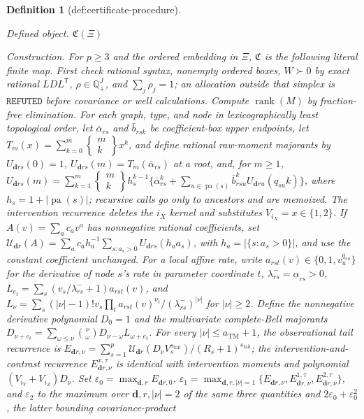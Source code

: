 \documentclass{article}
\newtheorem{definition}{Definition}
\begin{document}
\begin{definition}[def:certificate-procedure]\label{def:certificate-procedure}
\par\smallskip\noindent\emph{Defined object.} \(\mathfrak C(\Xi)\)
\par\smallskip\noindent\emph{Construction.} For \(p\geq3\) and the ordered embedding in \(\Xi\), \(\mathfrak C\) is the following literal finite map. First check rational syntax, nonempty ordered boxes, \(W\succ0\) by exact rational \(LDL^{\mathsf T}\), \(\rho\in\mathbb Q_+^J\), and \(\sum_j\rho_j=1\); an allocation outside that simplex is \(\mathtt{REFUTED}\) before covariance or well calculations. Compute \(\operatorname{rank}(M)\) by fraction-free elimination. For each graph, type, and node in lexicographically least topological order, let \(\bar\alpha_{rs}\) and \(\bar b_{rsk}\) be coefficient-box upper endpoints, let \(T_m(x)=\sum_{k=0}^m\left\{\begin{smallmatrix}m\\k\end{smallmatrix}\right\}x^k\), and define rational raw-moment majorants by \(U_{\boldsymbol d rs}(0)=1\), \(U_{\boldsymbol d rs}(m)=T_m(\bar\alpha_{rs})\) at a root, and, for \(m\geq1\), \(U_{\boldsymbol d rs}(m)=\sum_{k=1}^m\left\{\begin{smallmatrix}m\\k\end{smallmatrix}\right\}h_s^{k-1}\{\bar\alpha_{rs}^k+\sum_{u\in\operatorname{pa}(s)}\bar b_{rsu}^kU_{\boldsymbol d ru}(q_{su}k)\}\), where \(h_s=1+|\operatorname{pa}(s)|\); recursive calls go only to ancestors and are memoized. The intervention recurrence deletes the \(i_X\) kernel and substitutes \(V_{i_X}=x\in\{1,2\}\). If \(A(v)=\sum_ac_av^a\) has nonnegative rational coefficients, set \(\mathcal U_{\boldsymbol d r}(A)=\sum_ac_a h_a^{-1}\sum_{s:a_s>0}U_{\boldsymbol d rs}(h_aa_s)\), with \(h_a=|\{s:a_s>0\}|\), and use the constant coefficient unchanged. For a local affine rate, write \(a_{rst}(v)\in\{0,1,v_u^{q_{su}}\}\) for the derivative of node \(s\)'s rate in parameter coordinate \(t\), \(\lambda^-_{rs}=\underline\alpha_{rs}>0\), \(L_{e_t}=\sum_s(v_s/\lambda^-_{rs}+1)a_{rst}(v)\), and \(L_\nu=\sum_s(|\nu|-1)!v_s\prod_ta_{rst}(v)^{\nu_t}/(\lambda^-_{rs})^{|\nu|}\) for \(|\nu|\geq2\). Define the nonnegative derivative polynomial \(D_0=1\) and the multivariate complete-Bell majorants \(D_{\nu+e_t}=\sum_{\omega\leq\nu}\binom{\nu}{\omega}D_{\nu-\omega}L_{\omega+e_t}\). For every \(|\nu|\leq a_{\mathrm{TM}}+1\), the observational tail recurrence is \(E_{\boldsymbol d r,\nu}=\sum_{s=1}^p\mathcal U_{\boldsymbol d r}(D_\nu V_s^{s_{\mathrm{tail}}})/(R_s+1)^{s_{\mathrm{tail}}}\); the intervention-and-contrast recurrence \(E^{x,\tau}_{\boldsymbol d r,\nu}\) is identical with intervention moments and polynomial \((V_{i_Y}+V_{i_Z})D_\nu\). Set \(\varepsilon_0=\max_{\boldsymbol d,r}E_{\boldsymbol d r,0}\), \(\varepsilon_1=\max_{\boldsymbol d,r,|\nu|=1}\{E_{\boldsymbol d r,\nu},E^{1,\tau}_{\boldsymbol d r,\nu},E^{2,\tau}_{\boldsymbol d r,\nu}\}\), and \(\varepsilon_2\) to the maximum over \(\boldsymbol d,r,|\nu|=2\) of the same three quantities and \(2\varepsilon_0+\varepsilon_0^2\), the latter bounding covariance-product 
\end{definition}
\end{document}
